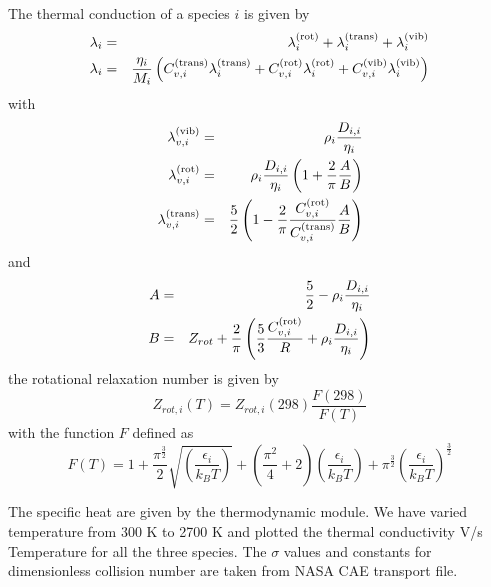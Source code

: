 The thermal conduction of a species $i$ is given by
\begin{eqnarray*}
\lambda_i &=& \lambda_i^{(\textnormal{rot})} + \lambda_i^{(\textnormal{trans})} + \lambda_i^{(\textnormal{vib})} \\
\lambda_i &=& \frac{\eta_i}{M_i} \left(
                        C_{v,i}^{(\textnormal{trans})} \lambda_i^{(\textnormal{trans})} + C_{v,i}^{(\textnormal{rot})} \lambda_i^{(\textnormal{rot})}+ C_{v,i}^{(\textnormal{vib})}  \lambda_i^{(\textnormal{vib})} 
                                          \right)
\end{eqnarray*}
with
\begin{eqnarray*}
\lambda_{v,i}^{(\textnormal{vib})}   & =& \rho_i \frac{D_{i,i}}{\eta_i} \\
\lambda_{v,i}^{(\textnormal{rot})}   & =& \rho_i \frac{D_{i,i}}{\eta_i}\left(1 + \frac{2}{\pi}\frac{A}{B}\right) \\
\lambda_{v,i}^{(\textnormal{trans})}   & =&  \frac{5}{2} \left(1 - \frac{2}{\pi}\frac{C_{v,i}^{(\textnormal{rot})}}{C_{v,i}^{(\textnormal{trans})}}\frac{A}{B}\right)
\end{eqnarray*}
%
and
%
\begin{eqnarray*}
  A & = & \frac{5}{2} -  \rho_i \frac{D_{i,i}}{\eta_i}  \\
  B & = & Z_{rot} + \frac{2}{\pi} \left(\frac{5}{3}\frac{C_{v,i}^{(\textnormal{rot})}}{R} + \rho_i \frac{D_{i,i}}{\eta_i}\right)
\end{eqnarray*}
%
\noindent the rotational relaxation number is given by
\begin{equation}
Z_{rot,i}(T) = Z_{rot,i}(298)\frac{F(298)}{F(T)}
\label{thermal_cond:Zrot}
\end{equation}
\noindent with the function $F$ defined as
\begin{equation}
F(T) = 1 + \frac{\pi^{\frac{3}{2}}}{2}\sqrt{\left(\frac{\epsilon_i}{k_B T}\right)}
         + \left(\frac{\pi^2}{4} + 2\right)\left(\frac{\epsilon_i}{k_B T}\right)
         + \pi^{\frac{3}{2}}\left(\frac{\epsilon_i}{k_B T}\right)^{\frac{3}{2}}
\end{equation}

\noindent The specific heat are given by the thermodynamic module.  We have varied temperature from 300 K to 2700 K and plotted the thermal conductivity V/s Temperature for all the  three species. The $\sigma$ values and constants for dimensionless collision number are taken from NASA CAE transport file.

